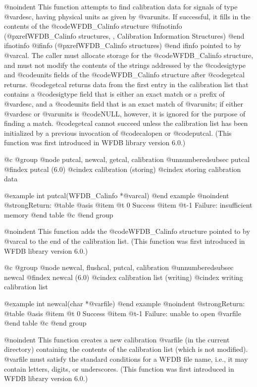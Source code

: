 {{{{{{{{@noindent
This function attempts to find calibration data for signals of type
@var{desc}, having physical units as given by @var{units}.  If
successful, it fills in the contents of the @code{WFDB_Calinfo} structure
@ifnotinfo
(@pxref{WFDB_Calinfo structures, , Calibration Information Structures})
@end ifnotinfo
@ifinfo
(@pxref{WFDB_Calinfo structures})
@end ifinfo
pointed to by @var{cal}.  The caller must allocate storage for the
@code{WFDB_Calinfo} structure, and must not modify the contents of the
strings addressed by the @code{sigtype} and @code{units} fields of the
@code{WFDB_Calinfo} structure after @code{getcal} returns.  @code{getcal}
returns data from the first entry in the calibration list that contains
a @code{sigtype} field that is either an exact match or a prefix of
@var{desc}, and a @code{units} field that is an exact match of
@var{units}; if either @var{desc} or @var{units} is @code{NULL},
however, it is ignored for the purpose of finding a match.
@code{getcal} cannot succeed unless the calibration list has been
initialized by a previous invocation of @code{calopen} or @code{putcal}.
(This function was first introduced in WFDB library version 6.0.)

@c @group
@node    putcal, newcal, getcal, calibration
@unnumberedsubsec putcal
@findex putcal (6.0)
@cindex calibration (storing)
@cindex storing calibration data

@example
int putcal(WFDB_Calinfo *@var{cal})
@end example
@noindent
@strong{Return:}
@table @asis
@item @t{ 0}
Success
@item @t{-1}
Failure: insufficient memory
@end table
@c @end group

@noindent
This function adds the @code{WFDB_Calinfo} structure pointed to by @var{cal}
to the end of the calibration list.  (This function was first introduced
in WFDB library version 6.0.)

@c @group
@node    newcal, flushcal, putcal, calibration
@unnumberedsubsec newcal
@findex newcal (6.0)
@cindex calibration list (writing)
@cindex writing calibration list

@example
int newcal(char *@var{file})
@end example
@noindent
@strong{Return:}
@table @asis
@item @t{ 0}
Success
@item @t{-1}
Failure: unable to open @var{file}
@end table
@c @end group

@noindent
This function creates a new calibration @var{file} (in the current
directory) containing the contents of the calibration list (which is not
modified).  @var{file} must satisfy the standard conditions for a WFDB
file name, i.e., it may contain letters, digits, or underscores.  (This
function was first introduced in WFDB library version 6.0.)

}}}}}}}}
